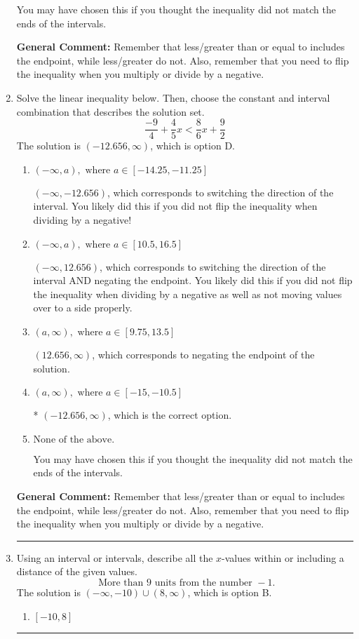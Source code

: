 \documentclass{extbook}[14pt]
\newcommand{\litem}[1]{\item #1

\rule{\textwidth}{0.4pt}}
\begin{document}
\begin{enumerate}
{\begin{enumerate}[label=\Alph*.]
You may have chosen this if you thought the inequality did not match the ends of the intervals.
\end{enumerate}

\textbf{General Comment:} Remember that less/greater than or equal to includes the endpoint, while less/greater do not. Also, remember that you need to flip the inequality when you multiply or divide by a negative.
}
\litem{
Solve the linear inequality below. Then, choose the constant and interval combination that describes the solution set.
\[ \frac{-9}{4} + \frac{4}{5} x < \frac{8}{6} x + \frac{9}{2} \]The solution is \( (-12.656, \infty) \), which is option D.\begin{enumerate}[label=\Alph*.]
\item \( (-\infty, a), \text{ where } a \in [-14.25, -11.25] \)

 $(-\infty, -12.656)$, which corresponds to switching the direction of the interval. You likely did this if you did not flip the inequality when dividing by a negative!
\item \( (-\infty, a), \text{ where } a \in [10.5, 16.5] \)

 $(-\infty, 12.656)$, which corresponds to switching the direction of the interval AND negating the endpoint. You likely did this if you did not flip the inequality when dividing by a negative as well as not moving values over to a side properly.
\item \( (a, \infty), \text{ where } a \in [9.75, 13.5] \)

 $(12.656, \infty)$, which corresponds to negating the endpoint of the solution.
\item \( (a, \infty), \text{ where } a \in [-15, -10.5] \)

* $(-12.656, \infty)$, which is the correct option.
\item \( \text{None of the above}. \)

You may have chosen this if you thought the inequality did not match the ends of the intervals.
\end{enumerate}

\textbf{General Comment:} Remember that less/greater than or equal to includes the endpoint, while less/greater do not. Also, remember that you need to flip the inequality when you multiply or divide by a negative.
}
\litem{
Using an interval or intervals, describe all the $x$-values within or including a distance of the given values.
\[ \text{ More than } 9 \text{ units from the number } -1. \]The solution is \( (-\infty, -10) \cup (8, \infty) \), which is option B.\begin{enumerate}[label=\Alph*.]
\item \( [-10, 8] \)


\end{enumerate}}
\end{enumerate}
\end{document}
